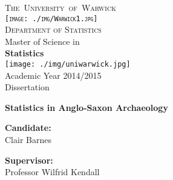 \documentclass[../../ArchStats.tex]{subfiles}
\begin{document}
\thispagestyle{empty}
\enlargethispage{60mm}
\begin{titlepage}
\begin{center}
\textsc{ \LARGE{T}\LARGE{he}\ \LARGE{University}\
\LARGE{of}\ \LARGE{Warwick}\
\\
\vspace{0.6cm}
\texttt{[image: ./img/Warwick1.jpg]}\\
\vspace{0.5cm}
{\LARGE Department of Statistics}}\\
\vspace{5mm}
\large Master of Science in \\
\Large \textbf{Statistics}\\
\vspace{0.8cm}
\texttt{[image: ./img/uniwarwick.jpg]}\\
\vspace{0.5cm}
\Large Academic Year 2014/2015\\
\vspace{0.7cm}
{\LARGE Dissertation}\\
\vspace{0.70cm}
\begin{LARGE}
\textbf{Statistics in Anglo-Saxon Archaeology}\\
\end{LARGE}
\vskip 1.2cm

\begin{LARGE}

\textbf{Candidate:}\\
Clair Barnes

\vskip 1.5cm
\centering
\parbox{17cm}{
    \hspace{0.2cm} \textbf{Supervisor:} \\  
  \hspace{0.2cm} Professor Wilfrid Kendall  
 }


\end{LARGE}
\end{center}
\end{titlepage}
\end{document}
